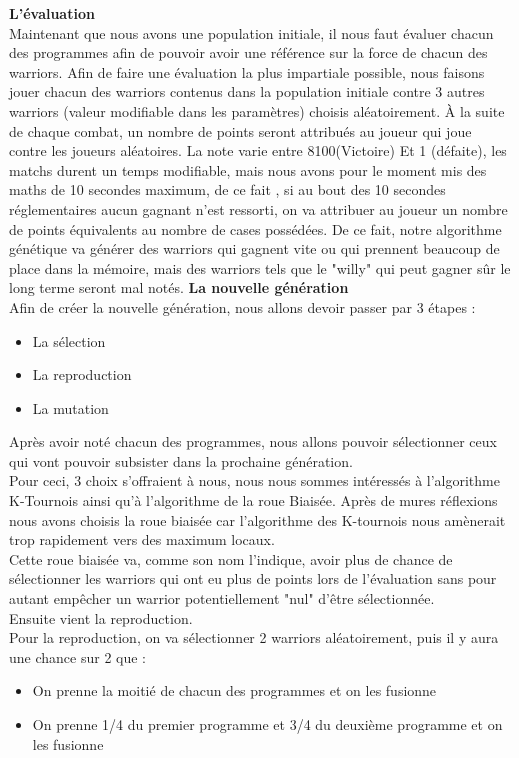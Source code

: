 \documentclass[a4paper,12pt]{article}
\begin{document}
\bigbreak
\textbf{L'évaluation}\\
Maintenant que nous avons une population initiale, il nous faut évaluer chacun des programmes afin de pouvoir avoir une référence sur la force de chacun des warriors. Afin de faire une évaluation la plus impartiale possible, nous faisons jouer chacun des warriors contenus dans la population initiale contre 3 autres warriors (valeur modifiable dans les paramètres) choisis aléatoirement. À la suite de chaque combat, un nombre de points seront attribués au joueur qui joue contre les joueurs aléatoires. La note varie entre 8100(Victoire) Et 1 (défaite), les matchs durent un temps modifiable, mais nous avons pour le moment mis des maths de 10 secondes maximum, de ce fait , si au bout des 10 secondes réglementaires aucun gagnant n'est ressorti, on va attribuer au joueur un nombre de points équivalents au nombre de cases possédées. De ce fait, notre algorithme génétique va générer des warriors qui gagnent vite ou qui prennent beaucoup de place dans la mémoire, mais des warriors tels que le "willy" qui peut gagner sûr le long terme seront mal notés.
\bigbreak
\textbf{La nouvelle génération}\\
Afin de créer la nouvelle génération, nous allons devoir passer par 3 étapes :
\begin{itemize}
\item La sélection
\item La reproduction
\item La mutation
\end{itemize}
Après avoir noté chacun des programmes, nous allons pouvoir sélectionner ceux qui vont pouvoir subsister dans la prochaine génération.\\
Pour ceci, 3 choix s'offraient à nous, nous nous sommes intéressés à l'algorithme K-Tournois ainsi qu'à l'algorithme de la roue Biaisée. Après de mures réflexions nous avons choisis la roue biaisée car l'algorithme des K-tournois nous amènerait trop rapidement vers des maximum locaux.\\
Cette roue biaisée va, comme son nom l'indique, avoir plus de chance de sélectionner les warriors qui ont eu plus de points lors de l'évaluation sans pour autant empêcher un warrior potentiellement "nul" d'être sélectionnée.\\
Ensuite vient la reproduction.\\
Pour la reproduction, on va sélectionner 2 warriors aléatoirement, puis il y aura une chance sur 2 que :\\
\begin{itemize}
\item On prenne la moitié de chacun des programmes et on les fusionne
\item On prenne 1/4 du premier programme et  3/4 du deuxième programme et on les fusionne
\end{itemize}
\end{document}

